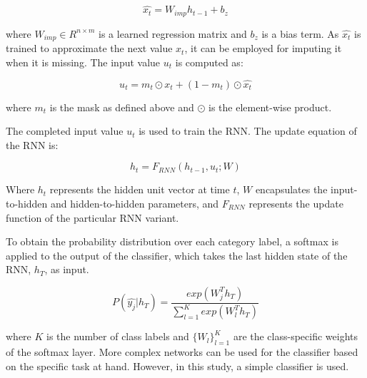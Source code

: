 \begin{equation}
  \hat{x_t} = W_{imp} h_{t-1} + b_z
\end{equation}

where $W_{imp} \in R^{n \times  m}$ is a learned regression matrix and $b_z$ is a bias term. 
As $\hat{x_t}$ is trained to approximate the next value $x_t$, it can be employed for imputing it when it is missing.
The input value $u_t$ is computed as:

\begin{equation}
  u_t = m_t \odot x_t + (1 - m_t) \odot \hat{x_t}
  \label{eq:AJRNNinput}
\end{equation}

where $m_t$ is the mask as defined above and $\odot$ is the element-wise product.

The completed input value $u_t$ is used to train the RNN.
The update equation of the RNN is:

\begin{equation}
  h_t = F_{RNN} (h_{t-1}, u_t; W)
\end{equation}

Where $h_t$ represents the hidden unit vector at time $t$, $W$ encapsulates the input-to-hidden and hidden-to-hidden parameters, and $F_{RNN}$ represents the update function of the particular RNN variant.

To obtain the probability distribution over each category label, a softmax is applied to the output of the classifier, which takes the last hidden state of the RNN, $h_T$, as input.

\begin{equation}
  P(\hat{y_j}|h_T ) = \frac{exp(W^T_j  h_T )}{\sum_{l=1}^K exp(W^T_l  h_T )}
  \label{eq:AJRNNsoftmax}
\end{equation}

where $K$ is the number of class labels and $\{W_l\}^K_{l=1}$ are the class-specific weights of the softmax layer.
More complex networks can be used for the classifier based on the specific task at hand. However, in this study, a simple classifier is used.



